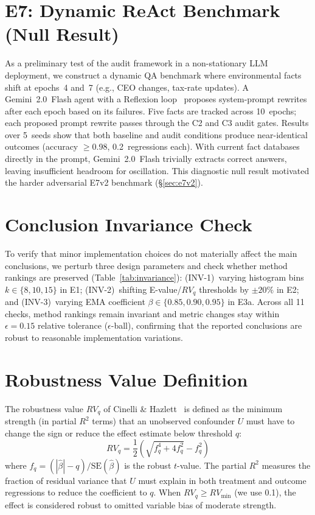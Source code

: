 \documentclass{article}
\begin{document}
\section{E7: Dynamic ReAct Benchmark (Null Result)}
\label{sec:e7-app}

As a preliminary test of the audit framework in a non-stationary
LLM deployment, we construct a dynamic QA benchmark where
environmental facts shift at epochs~4 and~7 (e.g., CEO changes,
tax-rate updates). A Gemini~2.0~Flash agent with a Reflexion
loop~\cite{shinn2023reflexion} proposes system-prompt rewrites
after each epoch based on its failures.
Five facts are tracked across 10~epochs; each proposed prompt
rewrite passes through the C2 and C3 audit gates.
Results over 5~seeds show that both baseline and audit conditions
produce near-identical outcomes (accuracy $\geq$0.98, 0.2~regressions
each). With current fact databases directly in the prompt,
Gemini~2.0~Flash trivially extracts correct answers, leaving
insufficient headroom for oscillation. This diagnostic null result
motivated the harder adversarial E7v2 benchmark (\S\ref{sec:e7v2}).


\section{Conclusion Invariance Check}
\label{sec:invariance-app}

To verify that minor implementation choices do not materially affect
the main conclusions, we perturb three design parameters and check
whether method rankings are preserved
(Table~\ref{tab:invariance}):
(INV-1)~varying histogram bins $k \in \{8, 10, 15\}$ in E1;
(INV-2)~shifting E-value/$RV_q$ thresholds by $\pm 20\%$ in E2;
and (INV-3)~varying EMA coefficient $\beta \in \{0.85, 0.90, 0.95\}$
in E3a.
Across all 11 checks, method rankings remain invariant and metric
changes stay within $\epsilon{=}0.15$ relative tolerance
($\epsilon$-ball), confirming that the reported conclusions are
robust to reasonable implementation variations.




\section{Robustness Value Definition}
\label{sec:rv-definition}

The robustness value $RV_q$ of Cinelli \& Hazlett~\cite{cinelli2020}
is defined as the minimum strength (in partial $R^2$ terms) that an
unobserved confounder $U$ must have to change the sign or reduce the
effect estimate below threshold $q$:
\begin{equation}
  RV_q = \frac{1}{2}\left(\sqrt{f_q^4 + 4f_q^2} - f_q^2\right)
\end{equation}
where $f_q = (|\hat{\beta}| - q) / \text{SE}(\hat{\beta})$ is the
robust $t$-value. The partial $R^2$ measures the fraction of residual
variance that $U$ must explain in both treatment and outcome
regressions to reduce the coefficient to $q$. When
$RV_q \geq RV_{\min}$ (we use 0.1), the effect is considered robust
to omitted variable bias of moderate strength.
\end{document}

